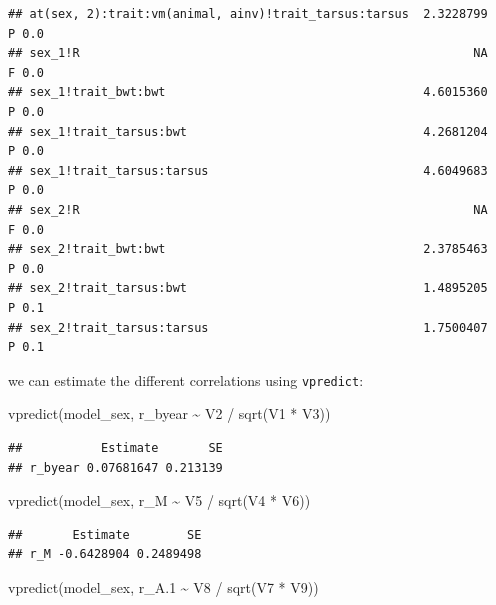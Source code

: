 \documentclass[
  12pt,
]{book}
\newenvironment{Shaded}{\begin{snugshade}}{\end{snugshade}}
\newcommand{\FloatTok}[1]{\textcolor[rgb]{0.00,0.00,0.81}{#1}}
\newcommand{\FunctionTok}[1]{\textcolor[rgb]{0.00,0.00,0.00}{#1}}
\newcommand{\NormalTok}[1]{#1}
\newcommand{\SpecialCharTok}[1]{\textcolor[rgb]{0.00,0.00,0.00}{#1}}
\begin{document}
\begin{verbatim}
## at(sex, 2):trait:vm(animal, ainv)!trait_tarsus:tarsus  2.3228799     P 0.0
## sex_1!R                                                       NA     F 0.0
## sex_1!trait_bwt:bwt                                    4.6015360     P 0.0
## sex_1!trait_tarsus:bwt                                 4.2681204     P 0.0
## sex_1!trait_tarsus:tarsus                              4.6049683     P 0.0
## sex_2!R                                                       NA     F 0.0
## sex_2!trait_bwt:bwt                                    2.3785463     P 0.0
## sex_2!trait_tarsus:bwt                                 1.4895205     P 0.1
## sex_2!trait_tarsus:tarsus                              1.7500407     P 0.1
\end{verbatim}

we can estimate the different correlations using \texttt{vpredict}:

\begin{Shaded}
\begin{Highlighting}[]
\FunctionTok{vpredict}\NormalTok{(model\_sex, r\_byear }\SpecialCharTok{\textasciitilde{}}\NormalTok{ V2 }\SpecialCharTok{/} \FunctionTok{sqrt}\NormalTok{(V1 }\SpecialCharTok{*}\NormalTok{ V3))}
\end{Highlighting}
\end{Shaded}

\begin{verbatim}
##           Estimate       SE
## r_byear 0.07681647 0.213139
\end{verbatim}

\begin{Shaded}
\begin{Highlighting}[]
\FunctionTok{vpredict}\NormalTok{(model\_sex, r\_M }\SpecialCharTok{\textasciitilde{}}\NormalTok{ V5 }\SpecialCharTok{/} \FunctionTok{sqrt}\NormalTok{(V4 }\SpecialCharTok{*}\NormalTok{ V6))}
\end{Highlighting}
\end{Shaded}

\begin{verbatim}
##       Estimate        SE
## r_M -0.6428904 0.2489498
\end{verbatim}

\begin{Shaded}
\begin{Highlighting}[]
\FunctionTok{vpredict}\NormalTok{(model\_sex, r\_A}\FloatTok{.1} \SpecialCharTok{\textasciitilde{}}\NormalTok{ V8 }\SpecialCharTok{/} \FunctionTok{sqrt}\NormalTok{(V7 }\SpecialCharTok{*}\NormalTok{ V9))}
\end{Highlighting}
\end{Shaded}
\end{document}
